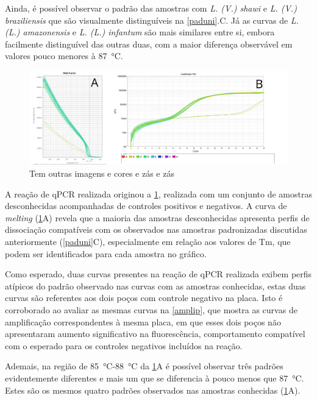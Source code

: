 Ainda, é possível observar o padrão das amostras com \textit{L. (V.) shawi} e
\textit{L. (V.) braziliensis} que são visualmente distinguíveis na
\cref{paduni}.C. Já as curvas de \textit{L. (L.) amazonensis} e \textit{L. (L.)
infantum} são mais similares entre si, embora facilmente distinguível das outras
duas,  com a maior diferença observável em valores pouco menores à
\qty{87}{\celsius}.

\begin{figure}
        \centering
        \includegraphics[width=.4\textwidth]{fig/prancheta_test_PCR}
        \caption{Tem outras imagens e cores e zás e zás}
        \label{tstuni}
\end{figure}

A reação de qPCR realizada originou a \cref{tstuni}, realizada com um conjunto
de amostras desconhecidas acompanhadas de controles positivos e negativos. A
curva de \textit{melting} (\cref{tstuni}A) revela que a maioria das amostras
desconhecidas apresenta perfis de dissociação compatíveis com os observados nas
amostras padronizadas discutidas anteriormente (\cref{paduni}C),
especialmente em relação aos valores de Tm, que podem ser 
identificados para cada amostra no gráfico.

Como esperado, duas curvas presentes na reação de qPCR realizada exibem perfis
atípicos do padrão observado nas curvas com as amostras conhecidas, estas duas
curvas são referentes aos dois poços com controle negativo na placa. Isto é
corroborado ao avaliar as mesmas curvas na \cref{amplip}, que mostra as curvas
de amplificação correspondentes à mesma placa, em que esses dois poços não
apresentaram aumento significativo na fluorescência, comportamento compatível
com o esperado para os controles negativos incluídos na reação.

Ademais, na região de \qty{85}{\celsius}-\qty{88}{\celsius} da \cref{tstuni}A é
possível observar três padrões evidentemente diferentes e mais um que se
diferencia à pouco menos que \qty{87}{\celsius}. Estes são os mesmos quatro
padrões observados nas amostras conhecidas (\cref{tstuni}A).
